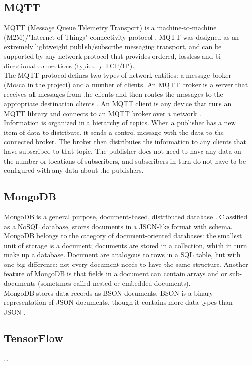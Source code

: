 \subsection{MQTT}
MQTT (Message Queue Telemetry Transport) is a machine-to-machine (M2M)/"Internet of Things" connectivity protocol \cite{MQTT}. MQTT was designed as an extremely lightweight publish/subscribe messaging transport, and can be supported by any network protocol that provides ordered, lossless and bi-directional connections \cite{MQTTDoc} (typically TCP/IP).\\
The MQTT protocol defines two types of network entities: a message broker (Mosca in the project) and a number of clients. An MQTT broker is a server that receives all messages from the clients and then routes the messages to the appropriate destination clients \cite{KnowMQTT}. An MQTT client is any device that runs an MQTT library and connects to an MQTT broker over a network \cite{ClientBroker}.\\
Information is organized in a hierarchy of topics. When a publisher has a new item of data to distribute, it sends a control message with the data to the connected broker. The broker then distributes the information to any clients that have subscribed to that topic. The publisher does not need to have any data on the number or locations of subscribers, and subscribers in turn do not have to be configured with any data about the publishers.

\subsection{MongoDB}
MongoDB is a general purpose, document-based, distributed database \cite{MongoDB}. Classified as a NoSQL database, stores documents in a JSON-like format with schema. MongoDB belongs to the category of document-oriented databases: the smallest unit of storage is a document; documents are stored in a collection, which in turn make up a database. Document are analogous to rows in a SQL table, but with one big difference: not every document needs to have the same structure. Another feature of MongoDB is that fields in a document can contain arrays and or sub-documents (sometimes called nested or embedded documents).\\
MongoDB stores data records as BSON documents. BSON is a binary representation of JSON documents, though it contains more data types than JSON \cite{BSONSpec}.

\subsection{TensorFlow}
\dots

